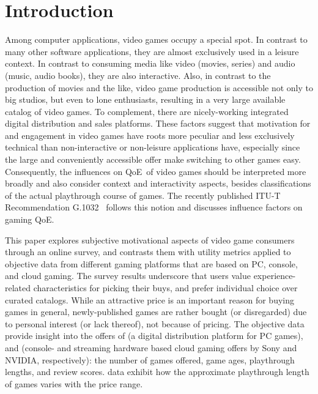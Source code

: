 
\section{Introduction}

Among computer applications, video games occupy a special spot.
In contrast to many other software applications, they are almost
exclusively used in a leisure context.
In contrast to consuming media like video (movies, series) and
audio (music, audio books), they are also interactive.
Also, in contrast to the production of movies and the like, video game
production is accessible not only to big studios, but even to lone
enthusiasts, resulting in a very large available catalog of video games.
To complement, there are nicely-working integrated digital distribution
and sales platforms.
These factors suggest that motivation for and engagement in video games
have roots more peculiar and less exclusively technical than
non-interactive or non-leisure applications have, especially since
the large and conveniently accessible offer make switching to other
games easy.
Consequently, the influences on \gls{QoE} of video games should be
interpreted more broadly and also consider context and interactivity
aspects, besides classifications of the actual playthrough course of
games.
The recently published \acrshort{ITU-T} Recommendation
G.1032~\cite{itutg1032} follows this notion and discusses influence
factors on gaming \gls{QoE}.

This paper explores subjective motivational aspects of video game
consumers through an online survey, and contrasts them with utility
metrics applied to objective data from different gaming platforms
that are based on PC, console, and cloud gaming.
The survey results underscore that users value experience-related
characteristics for picking their buys, and prefer individual choice
over curated catalogs. While an attractive price is an important
reason for buying games in general, newly-published games are rather
bought (or disregarded) due to personal interest (or lack thereof),
not because of pricing.
The objective data provide insight into the offers of \steam
(a digital distribution platform for PC games), \psnow and \gfnow
(console- and streaming hardware based cloud gaming offers by Sony
and NVIDIA, respectively): the number
of games offered, game ages, playthrough lengths, and review scores.
\steam data exhibit how the approximate playthrough length of games
varies with the price range.
